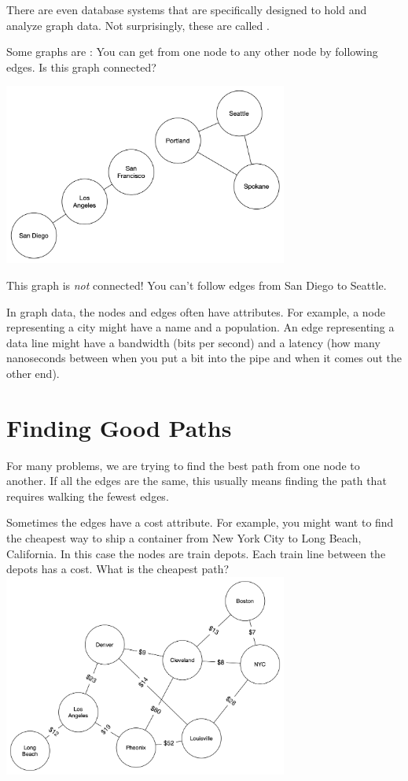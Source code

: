 There are even database systems that are specifically designed to hold
and analyze graph data. Not surprisingly, these are called
.

Some graphs are : You can get from one node to any
other node by following edges. Is this graph connected?

\includegraphics[width=0.7\textwidth]{notconnected.png}

This graph is \textit{not} connected! You can't follow edges from San Diego to Seattle.

In graph data, the nodes and edges often have attributes. For
example, a node representing a city might have a name and a
population. An edge representing a data line might have a bandwidth
(bits per second) and a latency (how many nanoseconds between when you
put a bit into the pipe and when it comes out the other end).

\section{Finding Good Paths}

For many problems, we are trying to find the best path from one
node to another. If all the edges are the same, this usually means
finding the path that requires walking the fewest edges.

Sometimes the edges have a cost attribute. For example, you might
want to find the cheapest way to ship a container from New York City
to Long Beach, California. In this case the nodes are train depots. Each
train line between the depots has a cost. What is the cheapest path?
\includegraphics[width=0.7\textwidth]{depots.png}

